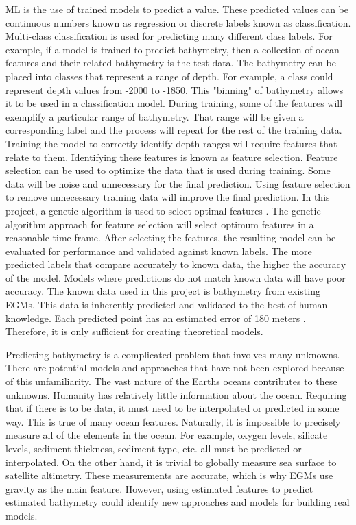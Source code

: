 \par
\ac{ML} is the use of trained models to predict a value.
These predicted values can be continuous numbers known as regression or discrete labels known as classification.
Multi-class classification is used for predicting many different class labels.
For example, if a model is trained to predict bathymetry, then a collection of ocean features and their related bathymetry is the test data.
The bathymetry can be placed into classes that represent a range of depth.
For example, a class could represent depth values from -2000 to -1850.
This "binning" of bathymetry allows it to be used in a classification model.
During training, some of the features will exemplify a particular range of bathymetry.
That range will be given a corresponding label and the process will repeat for the rest of the training data.
Training the model to correctly identify depth ranges will require features that relate to them.
Identifying these features is known as feature selection.
Feature selection can be used to optimize the data that is used during training.
Some data will be noise and unnecessary for the final prediction.
Using feature selection to remove unnecessary training data will improve the final prediction.
In this project, a genetic algorithm is used to select optimal features \cite{yang1998feature}.
The genetic algorithm approach for feature selection will select optimum features in a reasonable time frame.
After selecting the features, the resulting model can be evaluated for performance and validated against known labels.
The more predicted labels that compare accurately to known data, the higher the accuracy of the model.
Models where predictions do not match known data will have poor accuracy.
The known data used in this project is bathymetry from existing \ac{EGM}s.
This data is inherently predicted and validated to the best of human knowledge.
Each predicted point has an estimated error of 180 meters \cite{becker2009global}. 
Therefore, it is only sufficient for creating theoretical models.

\par
Predicting bathymetry is a complicated problem that involves many unknowns.
There are potential models and approaches that have not been explored because of this unfamiliarity.
The vast nature of the Earths oceans contributes to these unknowns.
Humanity has relatively little information about the ocean.
Requiring that if there is to be data, it must need to be interpolated or predicted in some way.
This is true of many ocean features.
Naturally, it is impossible to precisely measure all of the elements in the ocean.
For example, oxygen levels, silicate levels, sediment thickness, sediment type, etc. all must be predicted or interpolated.
On the other hand, it is trivial to globally measure sea surface to satellite altimetry.
These measurements are accurate, which is why \ac{EGM}s use gravity as the main feature.
However, using estimated features to predict estimated bathymetry could identify new approaches and models for building real models.

